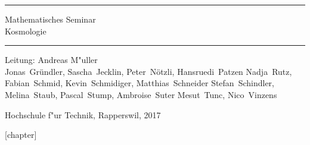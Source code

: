 \documentclass{book}
\begin{document}
\pagestyle{fancy}
\frontmatter
\newcommand\HRule{\noindent\rule{\linewidth}{1.5pt}}
\begin{titlepage}
\HRule
\vspace*{5pt}
\begin{flushright}
{
\LARGE
Mathematisches Seminar\\
\vspace*{20pt}
\Huge
Kosmologie%
}
\vspace*{5pt}
\end{flushright}
\HRule
\begin{flushright}
\vspace{60pt}
\Large
Leitung: Andreas M"uller\\
\vspace{40pt}
\Large
Jonas~Gründler,
Sascha~Jecklin,
Peter~Nötzli,
Hansruedi~Patzen %
Nadja~Rutz,
Fabian~Schmid,
Kevin~Schmidiger,
Matthias~Schneider %
Stefan~Schindler,
Melina~Staub,
Pascal~Stump,
Ambroise~Suter %
Mesut~Tunc,
Nico~Vinzens
\end{flushright}
\begin{center}
Hochschule f"ur Technik, Rapperswil, 2017
\end{center}
\end{titlepage}
\hypersetup{
    linktoc=all,
    linkcolor=blue
}
\newenvironment{beispiele}{
\bgroup\smallskip\parindent0pt\bf Beispiele\egroup

\begin{list}{\arabic{beispiel}.}
  {\usecounter{beispiel}
  \setlength{\labelsep}{5mm}
  \setlength{\rightmargin}{0pt}
}}{\end{list}}
\newenvironment{uebungsaufgaben}{
\begin{list}{\arabic{uebungsaufgabezaehler}.}
  {\usecounter{uebungsaufgabezaehler}
  \setlength{\labelwidth}{2cm}
  \setlength{\leftmargin}{0pt}
  \setlength{\labelsep}{5mm}
  \setlength{\rightmargin}{0pt}
  \setlength{\itemindent}{0pt}
}}{\end{list}\vfill\pagebreak}
\newenvironment{teilaufgaben}{
\begin{enumerate}
\renewcommand{\labelenumi}{\alph{enumi})}
}{\end{enumerate}}
[chapter]
\def\aufgabenpath{chapters/uebungsaufgaben/}
\def\ainput#1{\aufgabenpath/#1}
\def\verbatimainput#1{\expandafter}
\def\aufgabetoplevel#1{%
\expandafter\def\expandafter\inputpath{#1}%
\let\aufgabepath=\inputpath
}
\def\includeagraphics[#1]#2{\expandafter\texttt{[image: \\aufgabepath\#2]}}
\newcommand{\uebungsaufgabe}[1]{%
\refstepcounter{problemcounter}%
\label{#1}%
\bigskip{\parindent0pt\strut}\hbox{\bf\arabic{problemcounter}. }%
\expandafter\def\csname aufgabenpath\endcsname{\inputpath/}%
\expandafter
}
\renewcommand\theproblemcounter{\thechapter.\arabic{problemcounter}}
\end{document}
